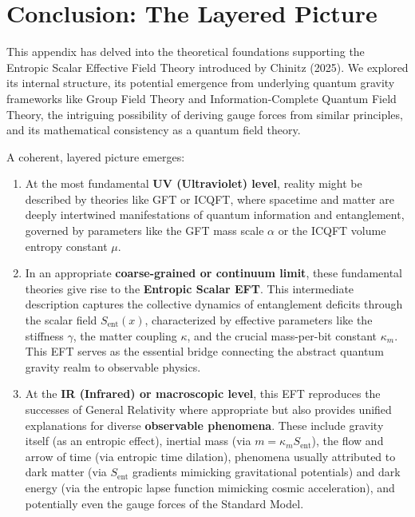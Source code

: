 \documentclass[11pt]{article}
\begin{document}
\section{Conclusion: The Layered Picture}\label{sec:conclusion_app3}

This appendix has delved into the theoretical foundations supporting the Entropic Scalar Effective Field Theory introduced by Chinitz (2025). We explored its internal structure, its potential emergence from underlying quantum gravity frameworks like Group Field Theory and Information-Complete Quantum Field Theory, the intriguing possibility of deriving gauge forces from similar principles, and its mathematical consistency as a quantum field theory.

A coherent, layered picture emerges:
\begin{enumerate}
    \item At the most fundamental \textbf{UV (Ultraviolet) level}, reality might be described by theories like GFT or ICQFT, where spacetime and matter are deeply intertwined manifestations of quantum information and entanglement, governed by parameters like the GFT mass scale $\alpha$ or the ICQFT volume entropy constant $\mu$.
    \item In an appropriate \textbf{coarse-grained or continuum limit}, these fundamental theories give rise to the \textbf{Entropic Scalar EFT}. This intermediate description captures the collective dynamics of entanglement deficits through the scalar field $S_{\mathrm{ent}}(x)$, characterized by effective parameters like the stiffness $\gamma$, the matter coupling $\kappa$, and the crucial mass-per-bit constant $\kappa_m$. This EFT serves as the essential bridge connecting the abstract quantum gravity realm to observable physics.
    \item At the \textbf{IR (Infrared) or macroscopic level}, this EFT reproduces the successes of General Relativity where appropriate but also provides unified explanations for diverse \textbf{observable phenomena}. These include gravity itself (as an entropic effect), inertial mass (via $m = \kappa_m S_{\mathrm{ent}}$), the flow and arrow of time (via entropic time dilation), phenomena usually attributed to dark matter (via $S_{\mathrm{ent}}$ gradients mimicking gravitational potentials) and dark energy (via the entropic lapse function mimicking cosmic acceleration), and potentially even the gauge forces of the Standard Model.
\end{enumerate}
\end{document}
